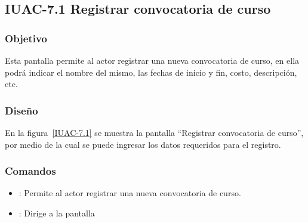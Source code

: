 \subsection{IUAC-7.1 Registrar convocatoria de curso}
 
\subsubsection{Objetivo}

    Esta pantalla permite al actor  registrar una nueva convocatoria de curso, en ella podrá indicar el nombre del mismo, las fechas de inicio y fin, costo, descripción, etc.

\subsubsection{Diseño}

    En la figura~\ref{IUAC-7.1} se muestra la pantalla ``Registrar convocatoria de curso'', por medio de la cual se puede ingresar los datos requeridos para el registro. \\


\subsubsection{Comandos}
\begin{itemize}
	 \item {}: Permite al actor registrar una nueva convocatoria de curso.
    \item {}: Dirige a la pantalla 
\end{itemize}

